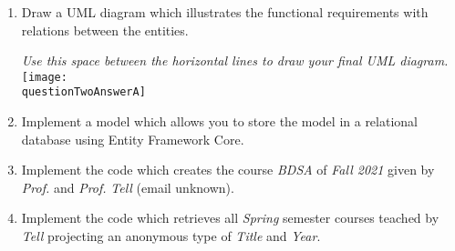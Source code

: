 \vskip 15pt
\begin{enumerate}[a]
    \item {} Draw a UML diagram which illustrates the functional requirements with relations between the entities.

\fullline\vspace{-8pt}
\begin{center}{
	\scriptsize{\emph{Use this space between the horizontal lines to draw your final UML diagram.}}
	\texttt{[image: \\questionTwoAnswerA]}
	}
\end{center}
\vfill
\fullline





\vskip 15pt
    \item {} Implement a model which allows you to store the model in a relational database using Entity Framework Core.
		





\vskip 15pt
    \item {} Implement the code which creates the course \textit{BDSA} of \textit{Fall 2021} given by \textit{Prof.}  and \textit{Prof.} \textit{Tell} (email unknown).
		





\newpage
    \item {} Implement the code which retrieves all \textit{Spring} semester courses teached by \textit{Tell} projecting an anonymous type of \textit{Title} and \textit{Year}.
		

\end{enumerate}




